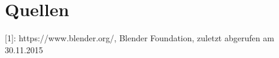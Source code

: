 \documentclass[12pt,a4paper,oneside,ngerman]{scrartcl}
\begin{document}
\section{Quellen}
[1]: https://www.blender.org/, Blender Foundation, zuletzt abgerufen am 30.11.2015 \newline

\end{document}
